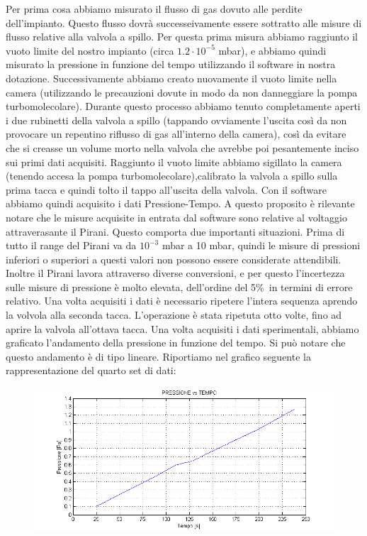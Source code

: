 \documentclass[11pt]{article}
\begin{document}
Per prima cosa abbiamo misurato il flusso di gas dovuto alle perdite dell'impianto. Questo flusso dovrà successeivamente essere sottratto alle misure di flusso relative alla valvola a spillo. Per questa prima misura abbiamo raggiunto il vuoto limite del nostro impianto (circa $1.2\cdot10^{-5}$ mbar), e abbiamo quindi misurato la pressione in funzione del tempo utilizzando il software in nostra dotazione.
Successivamente abbiamo creato nuovamente il vuoto limite nella camera (utilizzando le precauzioni dovute in modo da non danneggiare la pompa turbomolecolare). Durante questo processo abbiamo tenuto completamente aperti i due rubinetti della valvola a spillo (tappando ovviamente l'uscita così da non provocare un repentino riflusso di gas all'interno della camera), così da evitare che si creasse un volume morto nella valvola che avrebbe poi pesantemente inciso sui primi dati acquisiti. Raggiunto il vuoto limite abbiamo sigillato la camera (tenendo accesa la pompa turbomolecolare),calibrato la valvola a spillo sulla prima tacca e quindi tolto il tappo all'uscita della valvola. Con il software abbiamo quindi acquisito i dati Pressione-Tempo. 
A questo proposito è rilevante notare che le misure acquisite in entrata dal software sono relative al voltaggio attraverasante il Pirani. Questo comporta due importanti situazioni. Prima di tutto il range del Pirani va da $10^{-3}$ mbar a 10 mbar, quindi le misure di pressioni inferiori o superiori a questi valori non possono essere considerate attendibili. Inoltre il Pirani lavora attraverso diverse conversioni, e per questo l'incertezza sulle misure di pressione è molto elevata, dell'ordine del 5\%\ in termini di errore relativo. 
Una volta acquisiti i dati è necessario ripetere l'intera sequenza aprendo  la volvola alla seconda tacca. L'operazione è stata ripetuta otto volte, fino ad aprire la valvola all'ottava tacca.  
Una volta acquisiti i dati sperimentali, abbiamo graficato l'andamento della pressione in funzione del tempo. Si può notare che questo andamento è di tipo lineare. Riportiamo nel grafico seguente la rappresentazione del quarto set di dati:
 \begin{center} 
\begin{figure}[H]
\hspace{-90.5pt}
\includegraphics{graficoP4.png}


\end{figure}
\end{center}
\end{document}
